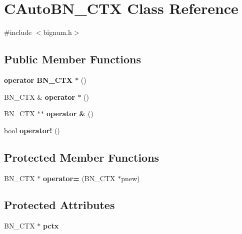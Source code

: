 \hypertarget{class_c_auto_b_n___c_t_x}{}\section{C\+Auto\+B\+N\+\_\+\+C\+TX Class Reference}
\label{class_c_auto_b_n___c_t_x}


{\ttfamily \#include $<$bignum.\+h$>$}

\subsection*{Public Member Functions}
\begin{DoxyCompactItemize}
\item 
\mbox{\label{class_c_auto_b_n___c_t_x_a17f28434d1ddfb3133ba34aaa73d44b4}} 
{\bfseries operator B\+N\+\_\+\+C\+T\+X $\ast$} ()
\item 
\mbox{\label{class_c_auto_b_n___c_t_x_a488b3e2475084e0d5c951b09bf0b4cdd}} 
B\+N\+\_\+\+C\+TX \& {\bfseries operator $\ast$} ()
\item 
\mbox{\label{class_c_auto_b_n___c_t_x_a534100cc31c84acc11fe9625bcc13d4a}} 
B\+N\+\_\+\+C\+TX $\ast$$\ast$ {\bfseries operator \&} ()
\item 
\mbox{\label{class_c_auto_b_n___c_t_x_a33c967d143efcbfafcac9f863fce1d4f}} 
bool {\bfseries operator!} ()
\end{DoxyCompactItemize}
\subsection*{Protected Member Functions}
\begin{DoxyCompactItemize}
\item 
\mbox{\label{class_c_auto_b_n___c_t_x_a954a9a333d2041861500e5cb471fa8f6}} 
B\+N\+\_\+\+C\+TX $\ast$ {\bfseries operator=} (B\+N\+\_\+\+C\+TX $\ast$pnew)
\end{DoxyCompactItemize}
\subsection*{Protected Attributes}
\begin{DoxyCompactItemize}
\item 
\mbox{\label{class_c_auto_b_n___c_t_x_a264ef42b71cb55111928fce1aa4d9ad3}} 
B\+N\+\_\+\+C\+TX $\ast$ {\bfseries pctx}
\end{DoxyCompactItemize}


